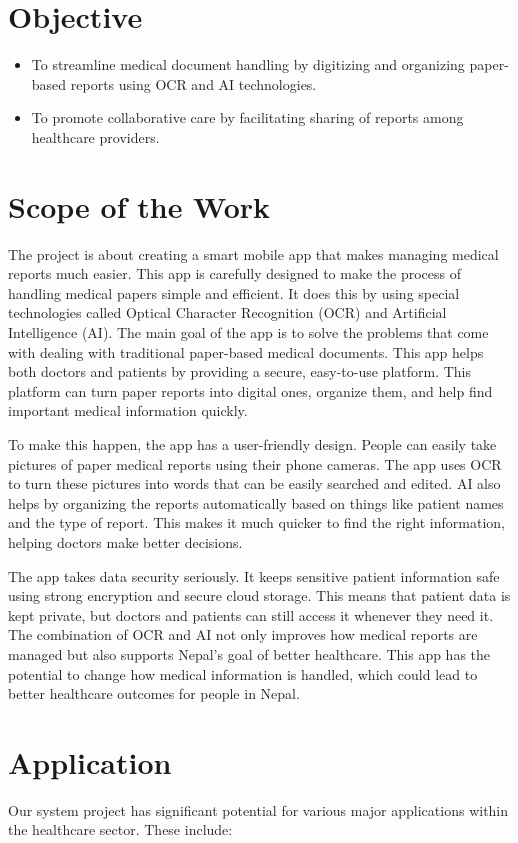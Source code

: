 \section{Objective}
\begin{itemize}
    \item To streamline medical document handling by digitizing and organizing paper-based reports using OCR and AI technologies.
    \item To promote collaborative care by facilitating sharing of reports among healthcare providers.
\end{itemize}

\section{Scope of the Work}
The project is about creating a smart mobile app that makes managing medical reports much easier. This app is carefully designed to make the process of handling medical papers simple and efficient. It does this by using special technologies called Optical Character Recognition (OCR) and Artificial Intelligence (AI). The main goal of the app is to solve the problems that come with dealing with traditional paper-based medical documents. This app helps both doctors and patients by providing a secure, easy-to-use platform. This platform can turn paper reports into digital ones, organize them, and help find important medical information quickly.

To make this happen, the app has a user-friendly design. People can easily take pictures of paper medical reports using their phone cameras. The app uses OCR to turn these pictures into words that can be easily searched and edited. AI also helps by organizing the reports automatically based on things like patient names and the type of report. This makes it much quicker to find the right information, helping doctors make better decisions.

The app takes data security seriously. It keeps sensitive patient information safe using strong encryption and secure cloud storage. This means that patient data is kept private, but doctors and patients can still access it whenever they need it. The combination of OCR and AI not only improves how medical reports are managed but also supports Nepal's goal of better healthcare. This app has the potential to change how medical information is handled, which could lead to better healthcare outcomes for people in Nepal.
\section{Application}
Our system project has significant potential for various major applications within the healthcare sector. These include:
